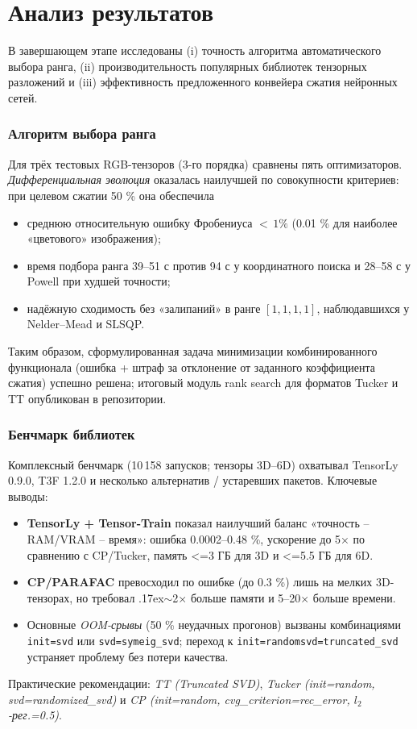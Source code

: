 \chapter{Анализ результатов}
\label{chap:eval}

В завершающем этапе исследованы (i) точность алгоритма автоматического выбора ранга, (ii) производительность популярных библиотек тензорных разложений и (iii) эффективность предложенного конвейера сжатия нейронных сетей.

\subsection*{Алгоритм выбора ранга}
Для трёх тестовых RGB-тензоров (3-го порядка) сравнены пять оптимизаторов. \emph{Дифференциальная эволюция} оказалась наилучшей по совокупности критериев: при целевом сжатии 50 \% она обеспечила
\begin{itemize}\setlength\itemsep{0.2em}
    \item среднюю относительную ошибку Фробениуса ${<}\,1\%$ (0.01 \% для наиболее «цветового» изображения);
    \item время подбора ранга 39–51 с против 94 с у координатного поиска и 28–58 с у Powell при худшей точности;
    \item надёжную сходимость без «залипаний» в ранге $[1,1,1,1]$, наблюдавшихся у Nelder–Mead и SLSQP.
\end{itemize}
Таким образом, сформулированная задача минимизации комбинированного функционала (ошибка + штраф за отклонение от заданного коэффициента сжатия) успешно решена; итоговый модуль rank search для форматов Tucker и TT опубликован в репозитории.

\subsection*{Бенчмарк библиотек}
Комплексный бенчмарк (10\,158 запусков; тензоры 3D–6D) охватывал TensorLy 0.9.0, T3F 1.2.0 и несколько альтернатив / устаревших пакетов. Ключевые выводы:
\begin{itemize}\setlength\itemsep{0.2em}
    \item \textbf{TensorLy + Tensor-Train} показал наилучший баланс «точность – RAM/VRAM – время»: ошибка 0.0002–0.48 \%, ускорение до 5× по сравнению с CP/Tucker, память <=3 ГБ для 3D и <=5.5 ГБ для 6D.
    \item \textbf{CP/PARAFAC} превосходил по ошибке (до 0.3 \%) лишь на мелких 3D-тензорах, но требовал {\raise.17ex\hbox{$\scriptstyle\sim$}}2× больше памяти и 5–20× больше времени.
    \item Основные \emph{OOM-срывы} (50 \% неудачных прогонов) вызваны комбинациями \texttt{init=svd} или \texttt{svd=symeig\_svd}; переход к \texttt{init=random}\texttt{svd=truncated\_svd} устраняет проблему без потери качества.
\end{itemize}
Практические рекомендации:  
\emph{TT (Truncated SVD)}, \emph{Tucker (init=random, svd=randomized\_svd)} и \emph{CP (init=random, cvg\_criterion=rec\_error, $l_2$-рег.=0.5)}.

